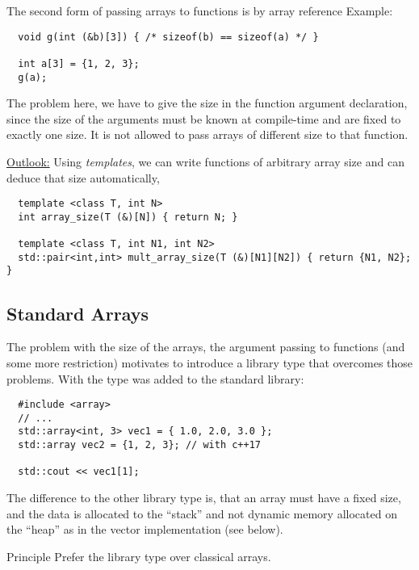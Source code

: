 The second form of passing arrays to functions is by array reference
%
%
Example:
\begin{verbatim}
  void g(int (&b)[3]) { /* sizeof(b) == sizeof(a) */ }

  int a[3] = {1, 2, 3};
  g(a);
\end{verbatim}
The problem here, we have to give the size in the function argument declaration, since the size of the arguments must be known
at compile-time and are fixed to exactly one size. It is not allowed to pass arrays of different size to that function.

\begin{rem}
\underline{Outlook:} Using \emph{templates}, we can write functions of arbitrary array size and can deduce that size automatically, \ie
\begin{verbatim}
  template <class T, int N>
  int array_size(T (&)[N]) { return N; }

  template <class T, int N1, int N2>
  std::pair<int,int> mult_array_size(T (&)[N1][N2]) { return {N1, N2}; }
\end{verbatim}
\end{rem}


\subsection{Standard Arrays}
The problem with the size of the arrays, the argument passing to functions (and some more restriction) motivates to introduce a library type
that overcomes those problems. With \marginpar{[\cxx{11}]} the type  was added to the standard
library:
\begin{verbatim}
  #include <array>
  // ...
  std::array<int, 3> vec1 = { 1.0, 2.0, 3.0 };
  std::array vec2 = {1, 2, 3}; // with c++17

  std::cout << vec1[1];
\end{verbatim}

The difference to the other library type  is, that an array must have a fixed size, and the data is allocated to the ``stack''
and not dynamic memory allocated on the ``heap'' as in the vector implementation (see below).

\begin{guideline}{Principle}
  Prefer the library type  over classical arrays.
\end{guideline}


